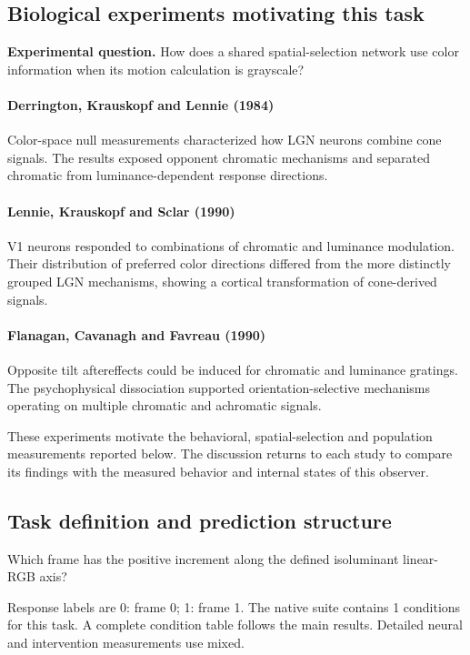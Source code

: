 \documentclass[11pt]{article}
\begin{document}
\subsection{Biological experiments motivating this task}
\textbf{Experimental question.} How does a shared spatial-selection network use color information when its motion calculation is grayscale?

\paragraph{Derrington, Krauskopf and Lennie (1984)} Color-space null measurements characterized how LGN neurons combine cone signals. The results exposed opponent chromatic mechanisms and separated chromatic from luminance-dependent response directions. \cite{bio_derrington}

\paragraph{Lennie, Krauskopf and Sclar (1990)} V1 neurons responded to combinations of chromatic and luminance modulation. Their distribution of preferred color directions differed from the more distinctly grouped LGN mechanisms, showing a cortical transformation of cone-derived signals. \cite{bio_lennie}

\paragraph{Flanagan, Cavanagh and Favreau (1990)} Opposite tilt aftereffects could be induced for chromatic and luminance gratings. The psychophysical dissociation supported orientation-selective mechanisms operating on multiple chromatic and achromatic signals. \cite{bio_flanagan}

These experiments motivate the behavioral, spatial-selection and population measurements reported below. The discussion returns to each study to compare its findings with the measured behavior and internal states of this observer.
\subsection{Task definition and prediction structure}
Which frame has the positive increment along the defined isoluminant linear-RGB axis?

Response labels are 0: frame 0; 1: frame 1. The native suite contains 1 conditions for this task. A complete condition table follows the main results. Detailed neural and intervention measurements use mixed.
\end{document}
